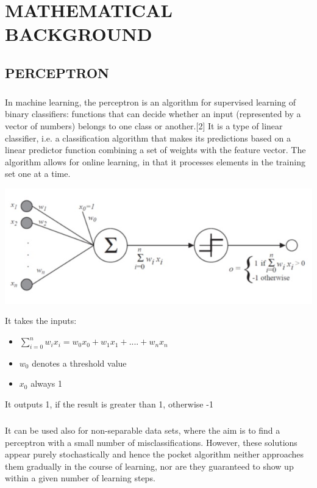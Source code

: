 \documentclass[11pt,a4paper,twoside]{report}
\begin{document}
\chapter{MATHEMATICAL BACKGROUND}

\section{PERCEPTRON}
\paragraph{ }In machine learning, the perceptron is an algorithm for supervised learning of binary classifiers: functions that can decide whether an input (represented by a vector of numbers) belongs to one class or another.[2] It is a type of linear classifier, i.e. a classification algorithm that makes its predictions based on a linear predictor function combining a set of weights with the feature vector. The algorithm allows for online learning, in that it processes elements in the training set one at a time.\\
\begin{center}
\includegraphics[scale=.75]{per.jpg}
\end{center}
It takes the inputs:
\begin{itemize}
\item $\sum_{i=0}^{n}w_ix_i =w_0x_0+w_1x_1+....+w_nx_n  $
\item $w_0$ denotes a threshold value
\item $x_0$ always 1
\end{itemize}
It outputs 1, if the result is greater than 1, otherwise -1
\paragraph{ }It can be used also for non-separable data sets, where the aim is to find a perceptron with a small number of misclassifications. However, these solutions appear purely stochastically and hence the pocket algorithm neither approaches them gradually in the course of learning, nor are they guaranteed to show up within a given number of learning steps.
\end{document}
